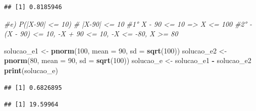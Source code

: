 \documentclass[
]{article}
\newenvironment{Shaded}{\begin{snugshade}}{\end{snugshade}}
\newcommand{\AttributeTok}[1]{\textcolor[rgb]{0.13,0.29,0.53}{#1}}
\newcommand{\CommentTok}[1]{\textcolor[rgb]{0.56,0.35,0.01}{\textit{#1}}}
\newcommand{\DecValTok}[1]{\textcolor[rgb]{0.00,0.00,0.81}{#1}}
\newcommand{\FloatTok}[1]{\textcolor[rgb]{0.00,0.00,0.81}{#1}}
\newcommand{\FunctionTok}[1]{\textcolor[rgb]{0.13,0.29,0.53}{\textbf{#1}}}
\newcommand{\NormalTok}[1]{#1}
\newcommand{\OtherTok}[1]{\textcolor[rgb]{0.56,0.35,0.01}{#1}}
\newcommand{\SpecialCharTok}[1]{\textcolor[rgb]{0.81,0.36,0.00}{\textbf{#1}}}
\begin{document}
\begin{verbatim}
## [1] 0.8185946
\end{verbatim}

\begin{Shaded}
\begin{Highlighting}[]
\CommentTok{\#e) P(|X{-}90| \textless{}= 10)}
\CommentTok{\# |X{-}90| \textless{}= 10 }
\CommentTok{\#1° X {-} 90 \textless{}= 10 =\textgreater{} X \textless{}= 100}
\CommentTok{\#2° {-}(X {-} 90) \textless{}= 10, {-}X + 90 \textless{}= 10, {-}X \textless{}= {-}80, X \textgreater{}= 80}

\NormalTok{solucao\_e1 }\OtherTok{\textless{}{-}} \FunctionTok{pnorm}\NormalTok{(}\DecValTok{100}\NormalTok{, }\AttributeTok{mean =} \DecValTok{90}\NormalTok{, }\AttributeTok{sd =} \FunctionTok{sqrt}\NormalTok{(}\DecValTok{100}\NormalTok{))}
\NormalTok{solucao\_e2 }\OtherTok{\textless{}{-}} \FunctionTok{pnorm}\NormalTok{(}\DecValTok{80}\NormalTok{, }\AttributeTok{mean =} \DecValTok{90}\NormalTok{, }\AttributeTok{sd =} \FunctionTok{sqrt}\NormalTok{(}\DecValTok{100}\NormalTok{))}
\NormalTok{solucao\_e }\OtherTok{\textless{}{-}}\NormalTok{ solucao\_e1 }\SpecialCharTok{{-}}\NormalTok{ solucao\_e2}
\FunctionTok{print}\NormalTok{(solucao\_e)}
\end{Highlighting}
\end{Shaded}

\begin{verbatim}
## [1] 0.6826895
\end{verbatim}

\begin{Shaded}
\end{Shaded}

\begin{verbatim}
## [1] 19.59964
\end{verbatim}
\end{document}
